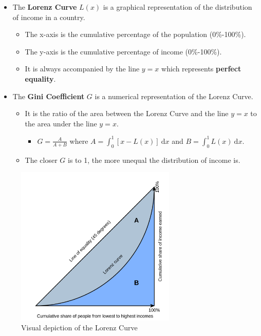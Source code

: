 \documentclass[
  letterpaper,
  DIV=11,
  numbers=noendperiod]{scrartcl}
\providecommand{\tightlist}{%
  \setlength{\itemsep}{0pt}\setlength{\parskip}{0pt}}\usepackage{longtable,booktabs,array}
\begin{document}
\begin{itemize}
\tightlist
\item
  The \textbf{Lorenz Curve} \(L(x)\) is a graphical representation of
  the distribution of income in a country.

  \begin{itemize}
  \tightlist
  \item
    The x-axis is the cumulative percentage of the population
    (0\%-100\%).
  \item
    The y-axis is the cumulative percentage of income (0\%-100\%).
  \item
    It is always accompanied by the line \(y=x\) which represents
    \textbf{perfect equality}.
  \end{itemize}
\item
  The \textbf{Gini Coefficient} \(G\) is a numerical representation of
  the Lorenz Curve.

  \begin{itemize}
  \tightlist
  \item
    It is the ratio of the area between the Lorenz Curve and the line
    \(y=x\) to the area under the line \(y=x\).

    \begin{itemize}
    \tightlist
    \item
      \(G = \frac{A}{A+B}\) where
      \(A = \int_{0}^{1} \left[x-L(x)\right] \ \mathrm{d}x\) and
      \(B = \int_{0}^{1}L(x) \ \mathrm{d}x\).
    \end{itemize}
  \item
    The closer \(G\) is to 1, the more unequal the distribution of
    income is.
  \end{itemize}
\end{itemize}

\begin{figure}[H]

{\centering \includegraphics[width=0.68\textwidth,height=\textheight]{img/lorenz.png}

}

\caption{Visual depiction of the Lorenz Curve}

\end{figure}%
\end{document}
